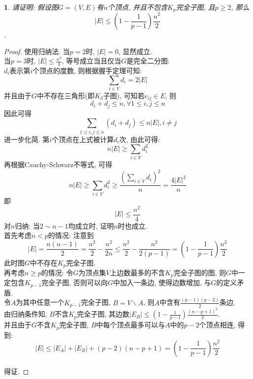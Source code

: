 \documentclass{exam}
\newtheorem{theorem}{}
\newtheorem{proof}{}
\begin{document}
    \begin{theorem}请证明: 假设图$G=(V,E)$有$n$个顶点, 并且不包含$K_p$完全子图, 且$p \geq 2$, 那么
        $$|E| \leq (1-\frac{1}{p-1})\frac{n^2}{2}$$.
    \end{theorem}
    \begin{proof}使用归纳法. 当$p=2$时, $|E|=0$, 显然成立.\\
        \indent 当$p=3$时, $|E| \leq \frac{n^2}{4}$, 等号成立当且仅当$G$是完全二分图:\\
        \indent \indent $d_i$表示第$i$个顶点的度数, 则根据握手定理可知: $$\sum_{i \in V}d_i=2|E|$$
        \indent \indent 并且由于$G$中不存在三角形(即$K_3$子图), 可知若$e_{ij} \in E$, 则$$d_i+d_j \leq n, \forall 1\leq i,j\leq n$$
        \indent \indent 因此可得$$\sum_{1\leq i,j\leq n}(d_i+d_j)\leq n|E|, i\neq j$$
        \indent \indent 进一步化简. 第$i$个顶点在上式被计算$d_i$次, 由此可得: $$n|E|\geq \sum_{i\in V}d_i^2$$
        \indent \indent 再根据Cauchy-Schwarz不等式, 可得$$n|E|\geq \sum_{i\in V}d_i^2\geq \frac{(\sum_{i\in V}d_i)^2}{n}=\frac{4|E|^2}{n}$$
        \indent \indent 即$$|E|\leq \frac{n^2}{4}$$
        \indent 对$n$归纳: 当$2 \sim n-1$均成立时, 证明$n$时也成立.\\
        \indent \indent 首先考虑$n<p$的情况: 注意到$$|E|=\frac{n(n-1)}{2}=\frac{n^2}{2}-\frac{n^2}{2n}\leq \frac{n^2}{2}-\frac{n^2}{2(p-1)}=(1-\frac{1}{p-1})\frac{n^2}{2}$$
        \indent \indent 此时图$G$中不存在$K_p$完全子图.\\
        \indent \indent 再考虑$n\geq p$的情况: 令$G$为顶点集$V$上边数最多的不含$K_p$完全子图的图, 则$G$中一定包含$K_{p-1}$完全子图, 否则可以向$G$中加入一条边, 使得边数增加, 与$G$的定义矛盾.\\
        \indent \indent 令$A$为其中任意一个$K_{p-1}$完全子图, $B=V\backslash A$, 则$A$中含有$\frac{(p-1)(p-2)}{2}$条边.\\
        \indent \indent 由归纳条件知, $B$不含$K_p$完全子图, 其边数$|E_B|\leq (1-\frac{1}{p-1})\frac{(n-p+1)^2}{2}$.\\
        \indent \indent 并且由于$G$不含$K_p$完全子图, $B$中每个顶点最多可以与$A$中的$p-2$个顶点相连, 得到: $$|E|\leq |E_A|+|E_B|+(p-2)(n-p+1)=(1-\frac{1}{p-1})\frac{n^2}{2}$$\\
        \indent 得证.
    \end{proof}
\end{document}

